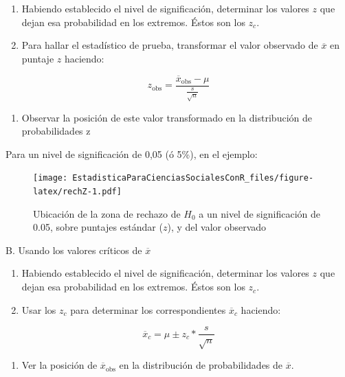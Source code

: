 \documentclass[]{book}
\providecommand{\tightlist}{%
  \setlength{\itemsep}{0pt}\setlength{\parskip}{0pt}}
\begin{document}
\begin{enumerate}
\def\labelenumi{\arabic{enumi}.}
\item
  Habiendo establecido el nivel de significación, determinar los
  valores \(z\) que dejan esa probabilidad en los extremos. Éstos son
  los \(z_{c}\).
\item
  Para hallar el estadístico de prueba, transformar el valor observado de \(\overline{x}\) en puntaje \(z\) haciendo:
\end{enumerate}

\[z_{\text{obs}} = \frac{{\overline{x}}_{\text{obs}} - \mu}{\frac{s}{\sqrt{n}}}\]

\begin{enumerate}
\def\labelenumi{\arabic{enumi}.}
\setcounter{enumi}{2}
\tightlist
\item
  Observar la posición de este valor transformado en la distribución
  de probabilidades z
\end{enumerate}

Para un nivel de significación de 0,05 (ó 5\%), en el ejemplo:

\begin{figure}
\centering
\texttt{[image: EstadisticaParaCienciasSocialesConR\_files/figure-latex/rechZ-1.pdf]}
\caption{\label{fig:rechZ}Ubicación de la zona de rechazo de \(H_{0}\) a un nivel de significación de 0.05, sobre puntajes estándar (\(z\)), y del valor observado}
\end{figure}

B. Usando los valores críticos de \(\overline{x}\)

\begin{enumerate}
\def\labelenumi{\arabic{enumi}.}
\item
  Habiendo establecido el nivel de significación, determinar los
  valores \(z\) que dejan esa probabilidad en los extremos. Éstos son los
  \(z_{c}\).
\item
  Usar los \(z_{c}\) para determinar los correspondientes \({\overline{x}}_{c}\) haciendo:
\end{enumerate}

\[{\overline{x}}_{c} = \mu \pm z_{c}*\frac{s}{\sqrt{n}}\]

\begin{enumerate}
\def\labelenumi{\arabic{enumi}.}
\setcounter{enumi}{2}
\tightlist
\item
  Ver la posición de \({\overline{x}}_{\text{obs}}\) en la distribución
  de probabilidades de \(\overline{x}\).
\end{enumerate}
\end{document}
